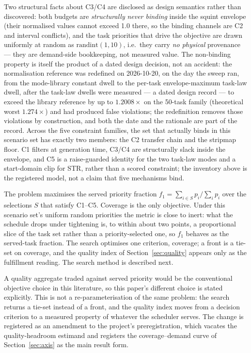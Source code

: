 \documentclass[preprint,authoryear]{elsarticle}
\begin{document}
Two structural facts about C3/C4 are disclosed as design semantics rather than discovered: both budgets are \emph{structurally} \emph{never binding} inside the squint envelope (their normalised values cannot exceed 1.0 there, so the binding channels are C2 and interval conflicts), and the task priorities that drive the objective are drawn uniformly at random as $\mathrm{randint}(1,10)$, i.e.\ they carry \emph{no physical} provenance --- they are demand-side bookkeeping, not measured value. The non-binding property is itself the product of a dated design decision, not an accident: the normalisation reference was redefined on 2026-10-20, on the day the sweep ran, from the mode-library constant dwell to the per-task envelope-maximum task-law dwell, after the task-law dwells were measured --- a dated design record --- to exceed the library reference by up to $1.2008\times$ on the 50-task family (theoretical worst $1.274\times$) and had produced false violations; the redefinition removes those violations by construction, and both the date and the rationale are part of the record. Across the five constraint families, the set that actually binds in this scenario set has exactly two members: the C2 transfer chain and the stripmap floor. C1 filters at generation time, C3/C4 are structurally slack inside the envelope, and C5 is a raise-guarded identity for the two task-law modes and a start-domain clip for STR, rather than a scored constraint; the inventory above is the registered model, not a claim that five mechanisms bind.

The problem maximises the served priority fraction $f_1=\sum_{i\in S}p_i/\sum_{i}p_i$ over the selections $S$ that satisfy C1--C5. Coverage is the only objective. Under this scenario set's uniform random priorities the metric is close to inert: what the schedule drops under tightening is, to within about two points, a proportional slice of the task set rather than a priority-selected one, so $f_1$ behaves as the served-task fraction. The search optimises one criterion, coverage; a front is a tie-set on coverage, and the quality index of Section~\ref{sec:quality} appears only as the fulfillment reading. The search method is described next.

A quality aggregate traded against served priority would be the conventional objective choice in this literature, so this paper's different choice is stated explicitly. This is not a re-parameterisation of the same problem: the search returns a tie-set instead of a front, and the quality index moves from a decision criterion to a measured property of whatever the scheduler serves. The change is registered as an amendment to the project's preregistration, which vacates the quality-headroom estimand and registers the coverage--demand curve of Section~\ref{sec:axis} as the main result form.
\end{document}
